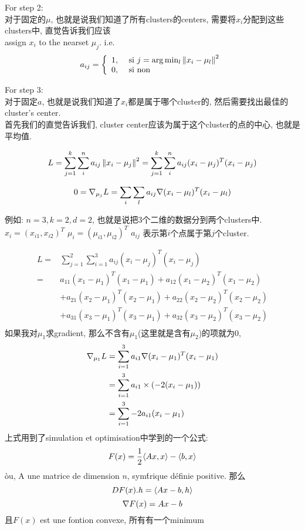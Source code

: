 \documentclass{article}
\begin{document}
For step 2:\\
对于固定的$\mu$, 也就是说我们知道了所有clusters的centers, 需要将$x_i$分配到这些clusters中, 直觉告诉我们应该\\
assign $x_i$ to the nearset $\mu_j$. i.e.
$$
a_{ij} =
\left\{
  \begin{array}{ll}
  1, & \textrm{\ si } j = \arg \min_l \left\Vert x_i - \mu_l\right\Vert^2\\
    0, & \textrm{ si non}
  \end{array}
\right.
$$

For step 3:\\
对于固定$a$, 也就是说我们知道了$x_i$都是属于哪个cluster的, 然后需要找出最佳的cluster's center.\\
首先我们的直觉告诉我们, cluster center应该为属于这个cluster的点的中心, 也就是平均值.

$$
\begin{aligned}
\end{aligned}
L
= \sum_{j = 1}^k \sum_i^n a_{ij}\left\Vert x_i - \mu_j\right\Vert^2
= \sum_{j = 1}^k \sum_i^n a_{ij}(x_i - \mu_j)^T (x_i - \mu_j)
$$

$$
0 = \nabla _{\mu_j}{L} = \sum_i \sum_l a_{ij} \nabla (x_i - \mu_l)^T (x_i - \mu_l)
$$

例如: $n=3, k=2, d=2$, 也就是说把3个二维的数据分到两个clusters中.\\
$x_i = (x_{i1}, x_{i2})^T$
$\mu_i = (\mu_{i1}, \mu_{i2})^T$
$a_{ij}$ 表示第$i$个点属于第$j$个cluster.

$$
\begin{aligned}
L
= & \sum_{j = 1}^2 \sum_{i=1}^3 a_{ij}(x_i - \mu_j)^T (x_i - \mu_j) \\
= &  a_{11}(x_1 - \mu_1)^T (x_1 - \mu_1) + a_{12}(x_1 - \mu_2)^T (x_1 - \mu_2) \\
& + a_{21}(x_2 - \mu_1)^T (x_2 - \mu_1) + a_{22}(x_2 - \mu_2)^T (x_2 - \mu_2) \\
& + a_{31}(x_3 - \mu_1)^T (x_3 - \mu_1) + a_{32}(x_3 - \mu_2)^T (x_3 - \mu_2) \\
\end{aligned}
$$
如果我对$\mu_1$求gradient, 那么不含有$\mu_1$(这里就是含有$\mu_2$)的项就为0,
$$
\begin{aligned}
\nabla _{\mu_1}{L}
& = \sum_{i = 1}^3 a_{i1}\nabla (x_i - \mu_1)^T (x_i - \mu_1) \\
& = \sum_{i = 1}^3 a_{i1} \times (-2(x_i - \mu_1)) \\
& = \sum_{i = 1}^3  -2a_{i1}(x_i - \mu_1) \\
\end{aligned}
$$
上式用到了simulation et optimisation中学到的一个公式:
$$
F(x)= \frac{1}{2} \langle Ax , x\rangle - \langle b , x\rangle
$$
\`ou, A une matrice de dimension $n$, sym\'trique d\'efinie positive. 那么
$$DF(x).h = \langle Ax - b , h\rangle$$
$$\nabla F(x) = Ax - b$$
且$F(x)$ est une fontion convexe, 所有有一个minimum
\end{document}
